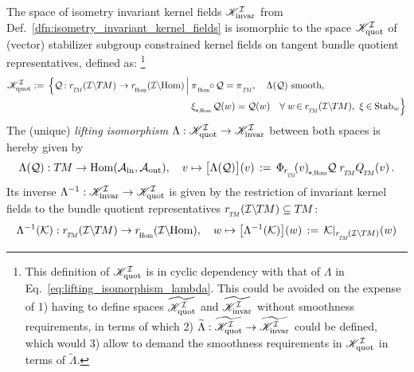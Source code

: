\begin{thm}
\label{thm:tangent_quotient_repr_kernel_fields}
    The space of isometry invariant kernel fields $\mathscr{K}_\textup{invar}^{\mathcal{I}}$ from Def.~\ref{dfn:isometry_invariant_kernel_fields} is isomorphic to the space $\mathscr{K}_\textup{quot}^{\mathcal{I}}$ of (vector) stabilizer subgroup constrained kernel fields on tangent bundle quotient representatives, defined as:%
    \footnote{
        This definition of $\mathscr{K}_\textup{quot}^{\mathcal{I}}$ is in cyclic dependency with that of $\Lambda$ in Eq.~\eqref{eq:lifting_isomorphism_lambda}.
        This could be avoided on the expense of 1) having to define spaces $\widetilde{\mathscr{K}_\textup{quot}^{\mathcal{I}}}$ and $\widetilde{\mathscr{K}_\textup{invar}^{\mathcal{I}}}$ without smoothness requirements, in terms of which 2) $\widetilde{\Lambda}: \widetilde{\mathscr{K}_\textup{quot}^{\mathcal{I}}} \to \widetilde{\mathscr{K}_\textup{invar}^{\mathcal{I}}}$ could be defined, which would 3) allow to demand the smoothness requirements in $\mathscr{K}_\textup{quot}^{\mathcal{I}}$ in terms of $\widetilde{\Lambda}$.
    }
    \begin{align}\label{eq:KIquot_def}
        \KIquot :=\,
            \Big\{ \Q \mkern-2mu: \rTM(\ITM) \to \rHom(\IHom) \,\Big|\:& 
            \piHom \mkern-5mu\circ\mkern-1mu \Q = \piTM,\quad
            \Lambda(\Q)\ \textup{smooth}, \\ &
            \dxiHom \Q(w) = \Q(w) \ \ \ \forall\; w \mkern-2mu\in\mkern-1mu \rTM(\ITM),\ \xi \mkern-1mu\in\mkern-1mu \Stab{w}
            \!\Big\} \notag
    \end{align}
    The (unique) \emph{lifting isomorphism} $\Lambda: \mathscr{K}_\textup{quot}^{\mathcal{I}} \to \mathscr{K}_\textup{invar}^{\mathcal{I}}$ between both spaces is hereby given by
    \begin{align}\label{eq:lifting_isomorphism_lambda}
        \Lambda(\Q): \TM \to \Hom(\Ain,\Aout),\ \ \ 
        v \mapsto \big[ \Lambda(\Q) \big](v) \,:=\, \dPhirHom{v} \Q\; \rTM \QTM(v) \,.
    \end{align}
    Its inverse $\Lambda^{-1}: \mathscr{K}_\textup{invar}^{\mathcal{I}} \to \mathscr{K}_\textup{quot}^{\mathcal{I}}$ is given by the restriction of invariant kernel fields to the bundle quotient representatives $\rTM(\ITM) \subseteq \TM$:
    \begin{align}\label{eq:lifting_isomorphism_lambda_inv}
        \Lambda^{-1}(\K): \rTM(\ITM) \to \rHom(\IHom),\ \ \ 
        w \mapsto \big[ \Lambda^{-1}(\K) \big](w) \,:=\, \Krestr(w)
    \end{align}
\end{thm}
